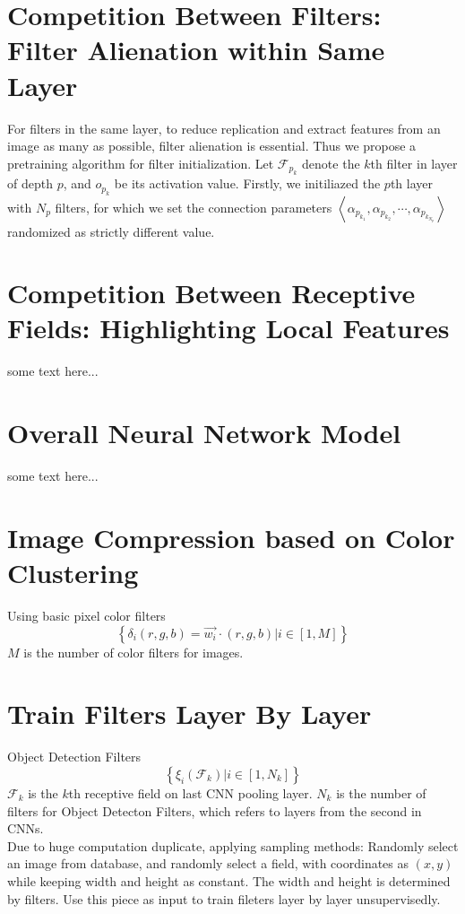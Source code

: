 \documentclass[conference]{IEEEtran}
\begin{document}
\section{Competition Between Filters: Filter Alienation within Same Layer}
For filters in the same layer, to reduce replication and extract features
from an image as many as possible, filter alienation is essential. Thus we
propose a pretraining algorithm for filter initialization.
Let $\mathcal{F}_{p_k}$ denote the $k$th filter in layer of
depth $p$, and $o_{p_k}$ be its activation value.
Firstly, we initiliazed the $p$th layer with $N_p$ filters,
for which we set the connection parameters
$\left<\alpha_{p_{k_1}},\alpha_{p_{k_2}},\cdots,\alpha_{p_{k_{N_p}}}\right>$
randomized as strictly different value.






\section{Competition Between Receptive Fields: Highlighting Local Features}
some text here...







\section{Overall Neural Network Model}
some text here...





\section{Image Compression based on Color Clustering}
Using basic pixel color filters
$$\left\{{\delta}_i(r,g,b)= \vec{w_i}\cdot(r,g,b)|i\in{[1,M]}\right\}$$
$M$ is the number of color filters for images.




\section{Train Filters Layer By Layer}
Object Detection Filters
$$\left\{\xi_i(\mathcal{F}_k) | i\in\left[1,N_k\right] \right\}$$
$\mathcal{F}_k$ is the $k$th receptive field on last CNN pooling layer.
$N_k$ is the number of filters for Object Detecton Filters, which refers to
layers from the second in CNNs.
\\
Due to huge computation duplicate, applying sampling methods:
Randomly select an image from database, and randomly select a field,
with coordinates as $(x,y)$ while keeping width and height as constant.
The width and height is determined by filters.
Use this piece as input to train fileters layer by layer unsupervisedly.
\end{document}
